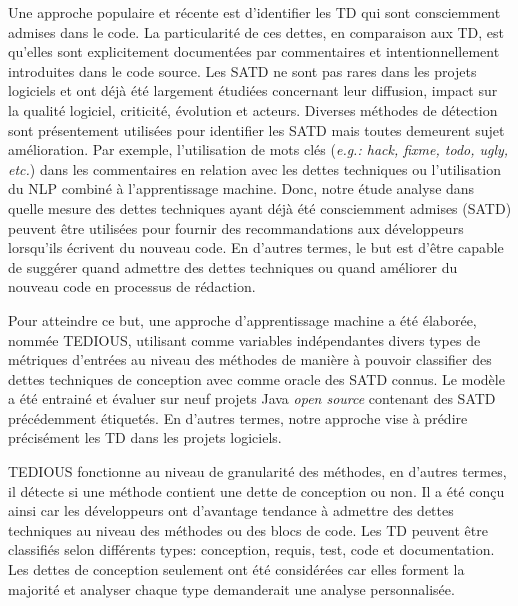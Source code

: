 Une approche populaire et r\'{e}cente est d'identifier les \ac{TD} qui sont consciemment admises dans le code. La particularit\'{e} de ces dettes, en comparaison aux \ac{TD}, est qu'elles sont explicitement document\'{e}es par commentaires et intentionnellement introduites dans le code source. Les \ac{SATD} ne sont pas rares dans les projets logiciels et ont d\'{e}j\`{a} \'{e}t\'{e} largement \'{e}tudi\'{e}es concernant leur diffusion, impact sur la qualit\'{e} logiciel, criticit\'{e}, \'{e}volution et acteurs. Diverses m\'{e}thodes de d\'{e}tection sont pr\'{e}sentement utilis\'{e}es pour identifier les \ac{SATD} mais toutes demeurent sujet am\'{e}lioration. Par exemple, l'utilisation de mots cl\'{e}s (\emph{e.g.: hack, fixme, todo, ugly, etc.}) dans les commentaires en relation avec les dettes techniques ou l'utilisation du \ac{NLP} combin\'{e} \`{a} l'apprentissage machine. Donc, notre \'{e}tude analyse dans quelle mesure des dettes techniques ayant d\'{e}j\`{a} \'{e}t\'{e} consciemment admises (\ac{SATD}) peuvent \^{e}tre utilis\'{e}es pour fournir des recommandations aux d\'{e}veloppeurs lorsqu'ils \'{e}crivent du nouveau code. En d'autres termes, le but est d'\^{e}tre capable de sugg\'{e}rer quand admettre des dettes techniques ou quand am\'{e}liorer du nouveau code en processus de r\'{e}daction. \par

Pour atteindre ce but, une approche d'apprentissage machine a \'{e}t\'{e} \'{e}labor\'{e}e, nomm\'{e}e \ac{TEDIOUS}, utilisant comme variables ind\'{e}pendantes divers types de m\'{e}triques d'entr\'{e}es au niveau des m\'{e}thodes de mani\`{e}re \`{a} pouvoir classifier des dettes techniques de conception avec comme oracle des \ac{SATD} connus. Le mod\`{e}le a \'{e}t\'{e} entrain\'{e} et \'{e}valuer sur neuf projets Java \emph{open source} contenant des \ac{SATD} pr\'{e}c\'{e}demment \'{e}tiquet\'{e}s. En d'autres termes, notre approche vise \`{a} pr\'{e}dire pr\'{e}cis\'{e}ment les \ac{TD} dans les projets logiciels. \par

\ac{TEDIOUS} fonctionne au niveau de granularit\'{e} des m\'{e}thodes, en d'autres termes, il d\'{e}tecte si une m\'{e}thode contient une dette de conception ou non. Il a \'{e}t\'{e} con\c{c}u ainsi car les d\'{e}veloppeurs ont d'avantage tendance \`{a} admettre des dettes techniques au niveau des m\'{e}thodes ou des blocs de code. Les \ac{TD} peuvent \^{e}tre classifi\'{e}s selon diff\'{e}rents types: conception, requis, test, code et documentation. Les dettes de conception seulement ont \'{e}t\'{e} consid\'{e}r\'{e}es car elles forment la majorit\'{e} et analyser chaque type demanderait une analyse personnalis\'{e}e. \par

